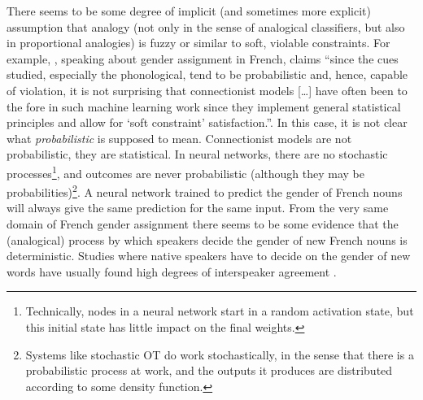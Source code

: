 There seems to be some degree of implicit (and sometimes more explicit) assumption that analogy (not only in the sense of analogical classifiers, but also in proportional analogies) is fuzzy or similar to soft, violable constraints. For example, \textcite[p. 880]{Matthews.2010}, speaking about gender assignment in French, claims ``since the cues studied, especially the phonological, tend to be probabilistic and, hence, capable of violation, it is not surprising that connectionist models [\dots] have often been to the fore in such machine learning work since they implement general statistical principles and allow for `soft constraint' satisfaction.''. In this case, it is not clear what \textit{probabilistic} is supposed to mean. Connectionist models are not probabilistic, they are statistical. In neural networks, there are no stochastic processes\footnote{Technically, nodes in a neural network start in a random activation state, but this initial state has little impact on the final weights.}, and outcomes are never probabilistic (although they may be probabilities)\footnote{Systems like stochastic OT \autocites{Boersma.1997, Boersma.1998, Boersma.2001} do work stochastically, in the sense that there is a probabilistic process at work, and the outputs it produces are distributed according to some density function.}. A neural network trained to predict the gender of French nouns will always give the same prediction for the same input. From the very same domain of French gender assignment there seems to be some evidence that the (analogical) process by which speakers decide the gender of new French nouns is deterministic. Studies where native speakers have to decide on the gender of new words have usually found high degrees of interspeaker agreement \autocites{Tucker.1968, Tucker.1977, Holmes.1999}.


